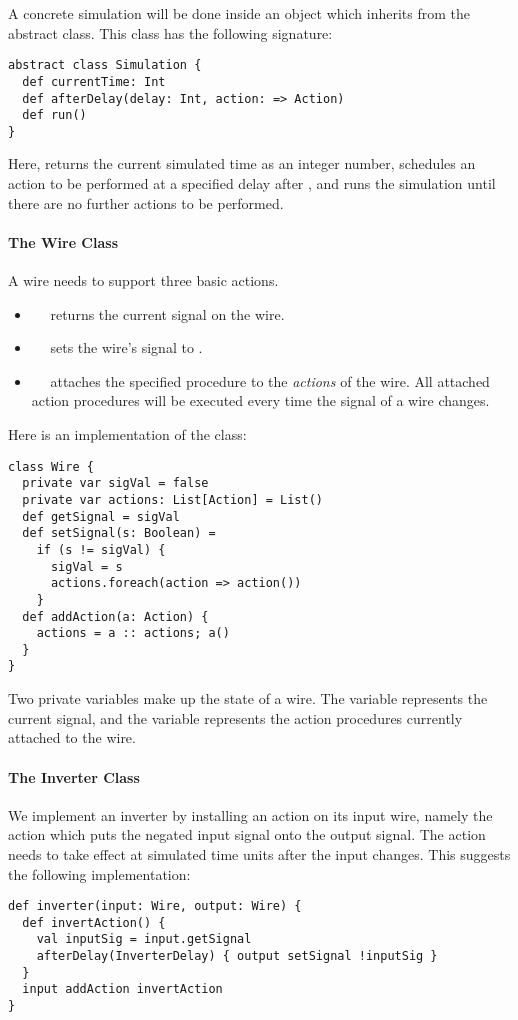 A concrete simulation will be done inside an object which inherits
from the abstract  class. This class has the following
signature:

\begin{lstlisting}
abstract class Simulation {
  def currentTime: Int
  def afterDelay(delay: Int, action: => Action)
  def run()
}
\end{lstlisting}
Here,
 returns the current simulated time as an integer
number,
 schedules an action to be performed at a specified
delay after , and
 runs the simulation until there are no further actions to be 
performed.

\paragraph{The Wire Class}
A wire needs to support three basic actions.
\begin{itemize}
\item[]
~~ returns the current signal on the wire.
\item[]
~~ sets the wire's signal to .
\item[]
~~ attaches the specified procedure
 to the {\em actions} of the wire. All attached action
procedures will be executed every time the signal of a wire changes.
\end{itemize}
Here is an implementation of the  class:
\begin{lstlisting}
class Wire {
  private var sigVal = false
  private var actions: List[Action] = List()
  def getSignal = sigVal
  def setSignal(s: Boolean) =
    if (s != sigVal) {
      sigVal = s
      actions.foreach(action => action())
    }
  def addAction(a: Action) {
    actions = a :: actions; a()
  }
}
\end{lstlisting}
Two private variables make up the state of a wire.  The variable
 represents the current signal, and the variable
 represents the action procedures currently attached to
the wire.

\paragraph{The Inverter Class}
We implement an inverter by installing an action on its input wire,
namely the action which puts the negated input signal onto the output
signal.  The action needs to take effect at 
simulated time units after the input changes. This suggests the 
following implementation:
\begin{lstlisting}
def inverter(input: Wire, output: Wire) {
  def invertAction() {
    val inputSig = input.getSignal
    afterDelay(InverterDelay) { output setSignal !inputSig }
  }
  input addAction invertAction
}
\end{lstlisting}

